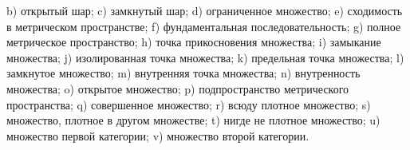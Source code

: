 b) открытый шар;
c) замкнутый шар;
d) ограниченное множество;
e) сходимость в метрическом пространстве;
f) фундаментальная последовательность;
g) полное метрическое пространство;
h) точка прикосновения множества;
i) замыкание множества;
j) изолированная точка множества;
k) предельная точка множества;
l) замкнутое множество;
m) внутренняя точка множества;
n) внутренность множества;
o) открытое множество;
p) подпространство метрического пространства;
q) совершенное множество;
r) всюду плотное множество;
s) множество, плотное в другом множестве;
t) нигде не плотное множество;
u) множество первой категории;
v) множество второй категории.
